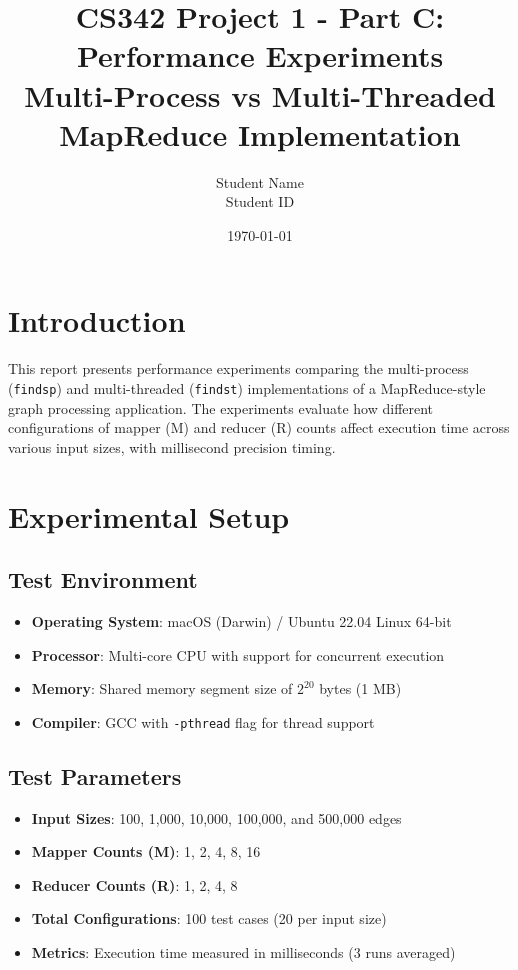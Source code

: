 \documentclass[11pt]{article}
\title{CS342 Project 1 - Part C: Performance Experiments\\
\large Multi-Process vs Multi-Threaded MapReduce Implementation}
\author{Student Name\\Student ID}
\date{\today}
\begin{document}
\maketitle

\section{Introduction}

This report presents performance experiments comparing the multi-process (\texttt{findsp}) and multi-threaded (\texttt{findst}) implementations of a MapReduce-style graph processing application. The experiments evaluate how different configurations of mapper (M) and reducer (R) counts affect execution time across various input sizes, with millisecond precision timing.

\section{Experimental Setup}

\subsection{Test Environment}
\begin{itemize}
    \item \textbf{Operating System}: macOS (Darwin) / Ubuntu 22.04 Linux 64-bit
    \item \textbf{Processor}: Multi-core CPU with support for concurrent execution
    \item \textbf{Memory}: Shared memory segment size of $2^{20}$ bytes (1 MB)
    \item \textbf{Compiler}: GCC with \texttt{-pthread} flag for thread support
\end{itemize}

\subsection{Test Parameters}
\begin{itemize}
    \item \textbf{Input Sizes}: 100, 1,000, 10,000, 100,000, and 500,000 edges
    \item \textbf{Mapper Counts (M)}: 1, 2, 4, 8, 16
    \item \textbf{Reducer Counts (R)}: 1, 2, 4, 8
    \item \textbf{Total Configurations}: 100 test cases (20 per input size)
    \item \textbf{Metrics}: Execution time measured in milliseconds (3 runs averaged)
\end{itemize}
\end{document}

